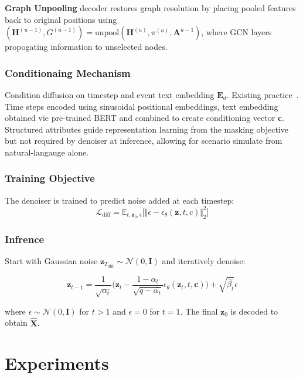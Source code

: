 \documentclass[11pt]{article}
\begin{document}
\textbf{Graph Unpooling} decoder restores graph resolution by placing pooled features back to original positions using $(\textbf{H}^{(u-1)}, G^{(u-1)}) = \text{unpool}(\textbf{H}^{(u)}, \pi^{(u)}, \textbf{A}^{u-1})$, where GCN layers propogating information to unselected nodes. 

\subsubsection{Conditionaing Mechanism}

Condition diffusion on timestep and event text embedding $\textbf{E}_d$. Existing practice~\cite{ge2025t2s,zhang2025}. Time steps encoded using sinusoidal positional embeddings, text embedding obtained vie pre-trained BERT and combined to create conditioning vector \textbf{c}. Structured attributes guide representation learning from the masking objective but not required by denoiser at inference, allowing for scenario simulate from natural-langauge alone.

\subsubsection{Training Objective}

The denoiser is trained to predict noise added at each timestep:
\[
  \mathcal{L}_{\text{diff}} = \mathbb{E}_{t, \textbf{z}_0, \epsilon} \big[\Vert\epsilon-\epsilon_\theta(\textbf{z}, t, {c})\Vert_2^2\big]
\]

\subsubsection{Infrence}

Start with Gaussian noise $\textbf{z}_{T_\text{diff}}\sim\mathcal{N}(0, \textbf{I})$ and iteratively denoise:

\[
  \textbf{z}_{t-1} = \frac{1}{\sqrt{\alpha_t}}
  \Big(  
    \textbf{z}_t - \frac{1-\alpha_t}{\sqrt{q-\bar{\alpha_t}}}\epsilon_\theta(\textbf{z}_t, t, \textbf{c})
  \Big)
  + \sqrt{\overset{\sim}{\beta_t}}\epsilon
\]

where $\epsilon\sim\mathcal{N}(0, \textbf{I})$ for $t>1$ and $\epsilon = 0$ for $t=1$. The final $\textbf{z}_0$ is decoded to obtain $\hat{\textbf{X}}$.

\section{Experiments}
\end{document}
